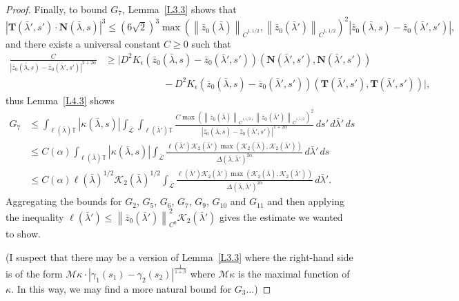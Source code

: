 \documentclass[reqno,centertags,12pt]{amsart}
\theoremstyle{definition}
\numberwithin{equation}{section}
\newcommand{\abs}[1]{\left\lvert#1\right\rvert}
\newcommand{\norm}[1]{\left\|#1\right\|}
\newcommand{\bbT}{{\mathbb{T}}}
\begin{document}
\begin{proof}
    Finally, to bound $G_{7}$, Lemma~\ref{L3.3} shows that
    \[
        \abs{\mathbf{T}(\bar{\lambda}',s')\cdot\mathbf{N}(\bar{\lambda},s)}^{3}
        \leq (6\sqrt{2})^{3}\max\left(
            \norm{\bar{z}_{0}(\bar{\lambda})}_{\dot{C}^{1,1/2}},
            \norm{\bar{z}_{0}(\bar{\lambda}')}_{\dot{C}^{1,1/2}}
        \right)^{2}
        \abs{\bar{z}_{0}(\bar{\lambda},s) - \bar{z}_{0}(\bar{\lambda}',s')},
    \]
    and there exists a universal constant $C\geq 0$ such that
    \begin{align*}
        \frac{C}
        {\abs{\bar{z}_{0}(\bar{\lambda},s) - \bar{z}_{0}(\bar{\lambda}',s')}^{2+2\alpha}}
        &\geq \bigg|
            D^{2}K_{\epsilon}(\bar{z}_{0}(\bar{\lambda},s) - \bar{z}_{0}(\bar{\lambda}',s'))
            (\mathbf{N}(\bar{\lambda}',s'),\mathbf{N}(\bar{\lambda}',s'))
            \\&\quad\quad\quad\quad\quad\quad
            - D^{2}K_{\epsilon}(\bar{z}_{0}(\bar{\lambda},s) - \bar{z}_{0}(\bar{\lambda}',s'))
            (\mathbf{T}(\bar{\lambda}',s'),\mathbf{T}(\bar{\lambda}',s'))
        \bigg|,
    \end{align*}
    thus Lemma~\ref{L4.3} shows
    \begin{align*}
        G_{7} &\leq
        \int_{\ell(\bar{\lambda})\bbT}\abs{\kappa(\bar{\lambda},s)}
        \int_{\bar{\mathcal{L}}}\int_{\ell(\bar{\lambda}')\bbT}
        \frac{C\max\left(
            \norm{\bar{z}_{0}(\bar{\lambda})}_{\dot{C}^{1,1/2}},
            \norm{\bar{z}_{0}(\bar{\lambda}')}_{\dot{C}^{1,1/2}}
        \right)^{2}}
        {\abs{\bar{z}_{0}(\bar{\lambda},s) - \bar{z}_{0}(\bar{\lambda}',s')}^{1+2\alpha}}
        \,ds'\,d\bar{\lambda}'\,ds \\
        &\leq C(\alpha)\int_{\ell(\bar{\lambda})\bbT}\abs{\kappa(\bar{\lambda},s)}
        \int_{\bar{\mathcal{L}}}
        \frac{\ell(\bar{\lambda}') \mathcal{K}_{2}(\bar{\lambda}')
        \max\left(\mathcal{K}_{2}(\bar{\lambda}), \mathcal{K}_{2}(\bar{\lambda}')\right)}
        {\Delta(\bar{\lambda},\bar{\lambda}')^{2\alpha}}
        \,d\bar{\lambda}'\,ds \\
        &\leq C(\alpha)\ell(\bar{\lambda})^{1/2}\mathcal{K}_{2}(\bar{\lambda})^{1/2}
        \int_{\bar{\mathcal{L}}}
        \frac{\ell(\bar{\lambda}') \mathcal{K}_{2}(\bar{\lambda}')
        \max\left(\mathcal{K}_{2}(\bar{\lambda}), \mathcal{K}_{2}(\bar{\lambda}')\right)}
        {\Delta(\bar{\lambda},\bar{\lambda}')^{2\alpha}}
        \,d\bar{\lambda}'.
    \end{align*}
    Aggregating the bounds for $G_{2}$, $G_{5}$, $G_{6}$, $G_{7}$, $G_{9}$,
    $G_{10}$ and $G_{11}$ and then applying the inequality
    $\ell(\bar{\lambda}') \leq \norm{\bar{z}_{0}(\bar{\lambda}')}_{C^{0}}^{2}
    \mathcal{K}_{2}(\bar{\lambda}')$ gives the estimate we wanted to show.
    
    (I suspect that there may be a version of
    Lemma~\ref{L3.3} where the right-hand side is of the form
    $\mathcal{M}\kappa \cdot \abs{\gamma_{1}(s_{1}) - \gamma_{2}(s_{2})}^{\frac{1}{1+\beta}}$
    where $\mathcal{M}\kappa$ is the maximal function of $\kappa$.
    In this way, we may find a more natural bound for $G_{3}$...)
\end{proof}
\end{document}
